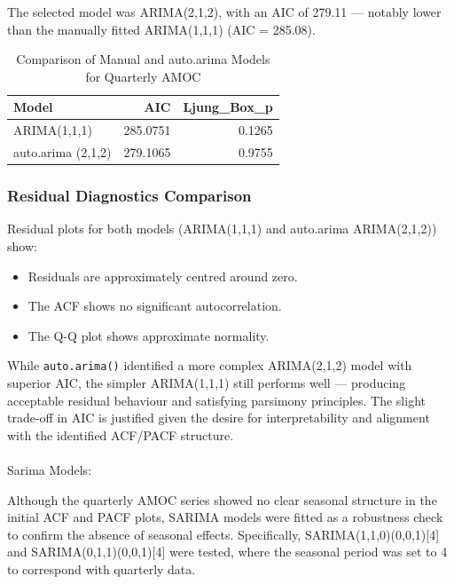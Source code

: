 \documentclass[
  11pt,
]{article}
\makeatletter
\let\oldparagraph\paragraph
\renewcommand{\paragraph}{
    \@ifstar
      \xxxParagraphStar
      \xxxParagraphNoStar
  }
\newcommand{\xxxParagraphStar}[1]{\oldparagraph*{#1}\mbox{}}
\newcommand{\xxxParagraphNoStar}[1]{\oldparagraph{#1}\mbox{}}
\makeatother
\begin{document}
The selected model was ARIMA(2,1,2), with an AIC of 279.11 --- notably
lower than the manually fitted ARIMA(1,1,1) (AIC = 285.08).

\begin{table}
\caption*{
{\large Comparison of Manual and auto.arima Models for Quarterly AMOC}
} 
\fontsize{12.0pt}{14.4pt}\selectfont
\begin{tabular*}{\linewidth}{@{\extracolsep{\fill}}lrr}
\toprule
Model & AIC & Ljung\_Box\_p \\ 
\midrule\addlinespace[2.5pt]
ARIMA(1,1,1) & 285.0751 & 0.1265 \\ 
auto.arima (2,1,2) & 279.1065 & 0.9755 \\ 
\bottomrule
\end{tabular*}
\end{table}

\subsubsection{Residual Diagnostics
Comparison}\label{residual-diagnostics-comparison}

Residual plots for both models (ARIMA(1,1,1) and auto.arima
ARIMA(2,1,2)) show:

\begin{itemize}
\item
  Residuals are approximately centred around zero.
\item
  The ACF shows no significant autocorrelation.
\item
  The Q-Q plot shows approximate normality.
\end{itemize}

While \texttt{auto.arima()} identified a more complex ARIMA(2,1,2) model
with superior AIC, the simpler ARIMA(1,1,1) still performs well ---
producing acceptable residual behaviour and satisfying parsimony
principles. The slight trade-off in AIC is justified given the desire
for interpretability and alignment with the identified ACF/PACF
structure.

\paragraph{Sarima Models:}\label{sarima-models}

Although the quarterly AMOC series showed no clear seasonal structure in
the initial ACF and PACF plots, SARIMA models were fitted as a
robustness check to confirm the absence of seasonal effects.
Specifically, SARIMA(1,1,0)(0,0,1){[}4{]} and
SARIMA(0,1,1)(0,0,1){[}4{]} were tested, where the seasonal period was
set to 4 to correspond with quarterly data.
\end{document}
